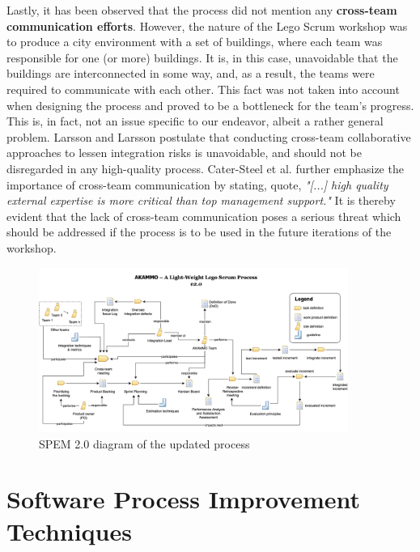 \documentclass[conference]{IEEEtran}
\begin{document}
Lastly, it has been observed that the process did not mention any
\textbf{cross-team communication efforts}. However, the nature of the Lego
Scrum workshop was to produce a city environment with a set of buildings, where
each team was responsible for one (or more) buildings. It is, in this case,
unavoidable that the buildings are interconnected in some way, and, as a
result, the teams were required to communicate with each other. This fact was
not taken into account when designing the process and proved to be a bottleneck
for the team's progress. This is, in fact, not an issue specific to our
endeavor, albeit a rather general problem. Larsson and Larsson
\cite{Larsson2020} postulate that conducting cross-team collaborative
approaches to lessen integration risks is unavoidable, and should not be
disregarded in any high-quality process. Cater-Steel et al.
\cite{CaterSteel2006} further emphasize the importance of cross-team
communication by stating, quote, \textit{"[...] high quality external expertise
is more critical than top management support."} It is thereby evident that the
lack of cross-team communication poses a serious threat which should be
addressed if the process is to be used in the future iterations of the
workshop.

\begin{figure}
	\centering
	\includegraphics[width=0.9\textwidth]{process-diagram.png}
  \caption{SPEM 2.0 diagram of the updated process}
	\label{fig:process-diagram}
\end{figure}

\section{Software Process Improvement Techniques}
\label{sec:spi-techniques}

\end{document}
